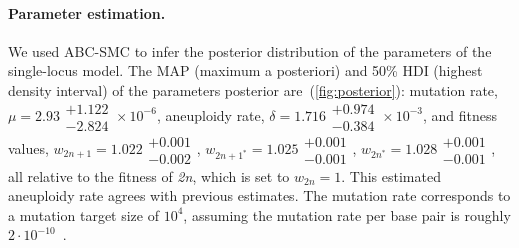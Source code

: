\documentclass[12pt]{extarticle}
\newcommand{\euwt}{\emph{2n}}
\begin{document}
\paragraph{Parameter estimation.} 
We used ABC-SMC to infer the posterior distribution of the parameters of the single-locus model.
The MAP (maximum a posteriori) and 50\% HDI (highest density interval) of the parameters posterior are~(\cref{fig:posterior}): %
mutation rate, $\mu=2.93\substack{+1.122 \\ -2.824}\times10^{-6}$,
aneuploidy rate, $\delta=1.716\substack{+0.974 \\ -0.384}\times10^{-3}$,
and fitness values, $w_{2n+1}=1.022\substack{+0.001 \\ -0.002}$,
$w_{2n+1^*}=1.025\substack{+0.001 \\ -0.001}$,
$w_{2n^*}=1.028\substack{+0.001 \\ -0.001}$, all relative to the fitness of \euwt, which is set to $w_{2n}=1$.
This estimated aneuploidy rate agrees with previous estimates. %
The mutation rate corresponds to a mutation target size of $10^{4}$, assuming the mutation rate per base pair is roughly $2\cdot10^{-10}$~\citep{Zhu2014}. 
\end{document}
